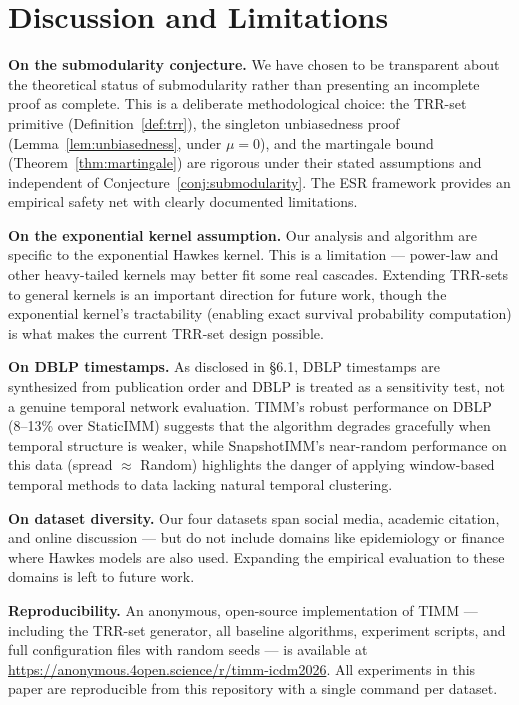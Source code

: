 \documentclass[10pt,conference]{IEEEtran}
\begin{document}
\section{Discussion and Limitations}

\textbf{On the submodularity conjecture.}
We have chosen to be transparent about the theoretical status of submodularity rather than presenting an incomplete proof as complete.
This is a deliberate methodological choice: the TRR-set primitive (Definition~\ref{def:trr}), the singleton unbiasedness proof (Lemma~\ref{lem:unbiasedness}, under $\mu{=}0$), and the martingale bound (Theorem~\ref{thm:martingale}) are rigorous under their stated assumptions and independent of Conjecture~\ref{conj:submodularity}.
The ESR framework provides an empirical safety net with clearly documented limitations.

\textbf{On the exponential kernel assumption.}
Our analysis and algorithm are specific to the exponential Hawkes kernel.
This is a limitation — power-law and other heavy-tailed kernels may better fit some real cascades.
Extending TRR-sets to general kernels is an important direction for future work, though the exponential kernel's tractability (enabling exact survival probability computation) is what makes the current TRR-set design possible.

\textbf{On DBLP timestamps.}
As disclosed in \S6.1, DBLP timestamps are synthesized from publication order and DBLP is treated as a sensitivity test, not a genuine temporal network evaluation.
TIMM's robust performance on DBLP (8--13\% over StaticIMM) suggests that the algorithm degrades gracefully when temporal structure is weaker, while SnapshotIMM's near-random performance on this data (spread $\approx$ Random) highlights the danger of applying window-based temporal methods to data lacking natural temporal clustering.

\textbf{On dataset diversity.}
Our four datasets span social media, academic citation, and online discussion — but do not include domains like epidemiology or finance where Hawkes models are also used.
Expanding the empirical evaluation to these domains is left to future work.

\textbf{Reproducibility.}
An anonymous, open-source implementation of TIMM — including the TRR-set generator, all baseline algorithms, experiment scripts, and full configuration files with random seeds — is available at \url{https://anonymous.4open.science/r/timm-icdm2026}. All experiments in this paper are reproducible from this repository with a single command per dataset.
\end{document}
